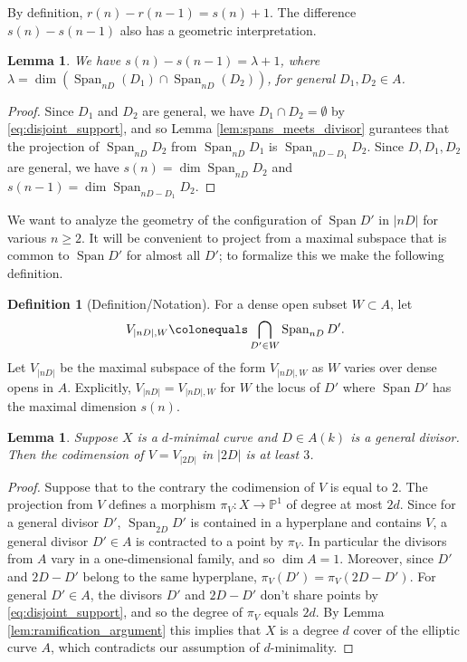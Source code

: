 \documentclass[11pt]{amsart}
\newcommand{\PP}{\mathbb{P}}
\newcommand{\Span}{\operatorname{Span}}
\newtheorem{lemma}[theorem]{Lemma}
\theoremstyle{definition}
\newtheorem{definition}[theorem]{Definition}
\theoremstyle{remark}
\begin{document}
By definition, $r(n)-r(n-1)=s(n) + 1$. The difference $s(n)-s(n-1)$ also has a geometric interpretation.

\begin{lemma}\label{lem:s_n_minus_one}
We have \(s(n) - s(n-1) =  \lambda +1\), where \(\lambda= \dim \left(\Span_{nD}(D_1) \cap \Span_{nD}(D_2)\right)\), for general \(D_1, D_2 \in A\).
\end{lemma}
\begin{proof}
Since \(D_1\) and \(D_2\) are general, we have \(D_1 \cap D_2 = \emptyset\) by \eqref{eq:disjoint_support}, and so Lemma \ref{lem:spans_meets_divisor} gurantees that the projection of $\Span_{nD} D_2$ from $\Span_{nD} D_1$ is $\Span_{nD-D_1} D_2$. Since $D, D_1, D_2$ are general, we have $s(n)=\dim\Span_{nD} D_2$ and $s(n-1)=\dim\Span_{nD-D_1} D_2$. 
\end{proof}

We want to analyze the geometry of the configuration of $\Span D'$ in $|nD|$ for various $n\geqslant 2$. It will be convenient to project from a maximal subspace that is common to $\Span D'$ for almost all $D'$; to formalize this we make the following definition. 

\begin{definition}[Definition/Notation]
For a dense open subset $W \subset A$, let 
\[V_{|nD|, W}\colonequals \bigcap_{D' \in W} \Span_{nD}D'.\] 
Let $V_{|nD|}$ be the maximal subspace of the form $V_{|nD|,W}$ as $W$ varies over dense opens in $A$.  Explicitly, \(V_{|nD|} = V_{|nD|, W}\) for \(W\) the locus of \(D'\) where \(\Span D'\) has the maximal dimension \(s(n)\).
\end{definition}



\begin{lemma}\label{elliptic-case}
Suppose $X$ is a $d$-minimal curve and $D \in A(k)$ is a general divisor. Then the codimension of $V = V_{|2D|}$ in $|2D|$ is at least $3$.
\end{lemma}
\begin{proof}
Suppose that to the contrary the codimension of $V$ is equal to $2$. The projection from $V$ defines a morphism $\pi_V: X \to \PP^1$ of degree at most $2d$. Since for a general divisor $D'$, $\Span_{2D}D'$ is contained in a hyperplane and contains $V$, a general divisor $D' \in A$ is contracted to a point by $\pi_V$. In particular the divisors from $A$ vary in a one-dimensional family, and so $\dim A = 1$. Moreover, since $D'$ and $2D-D'$ belong to the same hyperplane, $\pi_V(D')=\pi_V(2D-D')$. For general $D'\in A$, the divisors $D'$ and $2D-D'$ don't share points by \eqref{eq:disjoint_support}, and so the degree of $\pi_V$ equals $2d$.  By Lemma \ref{lem:ramification_argument} this implies that \(X\) is a degree \(d\) cover of the elliptic curve \(A\), which contradicts our assumption of \(d\)-minimality. 
\end{proof}
\end{document}
